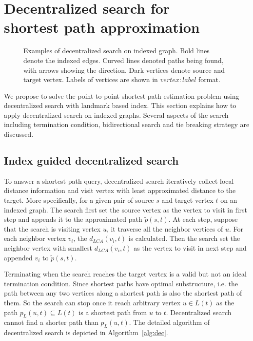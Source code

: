 \section{Decentralized search for \\ shortest path approximation}
\label{searching}

\begin{figure*}[ht]
    \centering
    \caption{Examples of decentralized search on indexed graph. Bold lines denote the indexed edges. Curved lines denoted paths being found, with arrows showing the direction. Dark vertices denote source and target vertex. Labels of vertices are shown in $vertex:label$ format.}
\end{figure*}

We propose to solve the point-to-point shortest path estimation problem using decentralized search with landmark based index. This section explains how to apply decentralized search on indexed graphs. Several aspects of the search including termination condition, bidirectional search and tie breaking strategy are discussed. 

\subsection{Index guided decentralized search}

To answer a shortest path query, decentralized search iteratively collect local distance information and visit vertex with least approximated distance to the target. More specifically, for a given pair of source $s$ and target vertex $t$ on an indexed graph. The search first set the source vertex as the vertex to visit in first step and appends it to the approximated path $\tilde{p}(s,t)$. At each step, suppose that the search is visiting vertex $u$, it traverse all the neighbor vertices of $u$. For each neighbor vertex $v_i$, the $d_{LCA}(v_i,t)$ is calculated. Then the search set the neighbor vertex with smallest $d_{LCA}(v_i,t)$ as the vertex to visit in next step and appended $v_i$ to $\tilde{p}(s,t)$. 
 
Terminating when the search reaches the target vertex is a valid but not an ideal termination condition. Since shortest paths have optimal substructure, i.e. the path between any two vertices along a shortest path is also the shortest path of them. So the search can stop once it reach arbitrary vertex $u \in L(t)$ as the path $p_L(u,t) \subseteq L(t)$ is a shortest path from $u$ to $t$. Decentralized search cannot find a shorter path than $p_L(u,t)$. The detailed algorithm of decentralized search is depicted in Algorithm~\ref{alg:dec}.


